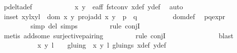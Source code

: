 \begin{isabellebody}
\ p{\isacharunderscore}delta{\isacharunderscore}def\ \isanewline
\ \ \ \ \ \ \ \ \isamarkupfalse%
\ {\isacartoucheopen}{\isasymtau}\ {\isacharparenleft}x{\isacharprime}{\isacharcomma}\ y{\isacharprime}{\isacharparenright}\ {\isasymin}\ e{\isacharunderscore}aff{\isacartoucheclose}\ fst{\isacharunderscore}conv\ x{\isacharprime}{\isacharprime}{\isacharunderscore}def\ y{\isacharprime}{\isacharprime}{\isacharunderscore}def\ \isamarkupfalse%
\ auto\isanewline
\ \ \ \ \ \ \isamarkupfalse%
\ in{\isacharunderscore}set{\isacharcolon}\ {\isachardoublequoteopen}{\isacharparenleft}{\isacharparenleft}{\isacharparenleft}x{\isacharcomma}y{\isacharparenright}{\isacharcomma}l{\isacharparenright}{\isacharcomma}{\isacharparenleft}{\isacharparenleft}x{\isacharprime}{\isacharprime}{\isacharcomma}y{\isacharprime}{\isacharprime}{\isacharparenright}{\isacharcomma}l{\isacharprime}{\isacharplus}{}{\isacharparenright}{\isacharparenright}\ {\isasymin}\ {\isacharparenleft}dom\ {\isacharparenleft}{\isasymlambda}{\isacharparenleft}x{\isacharcomma}\ y{\isacharparenright}{\isachardot}\ proj{\isacharunderscore}add\ x\ y{\isacharparenright}\ {\isasyminter}\ p\ {\isasymtimes}\ q{\isacharparenright}{\isachardoublequoteclose}\isanewline
\ \ \ \ \ \ \ \ \isamarkupfalse%
\ dom{\isacharunderscore}def\ \isamarkupfalse%
\ p{\isacharunderscore}q{\isacharunderscore}expr\ \isanewline
\ \ \ \ \ \ \ \ \isamarkupfalse%
{\isacharparenleft}simp\ del{\isacharcolon}\ {\isasymtau}{\isachardot}simps{\isacharparenright}\isanewline
\ \ \ \ \ \ \ \ \isamarkupfalse%
{\isacharparenleft}rule\ conjI{\isacharparenright}\isanewline
\ \ \ \ \ \ \ \ \isamarkupfalse%
\ {\isacharparenleft}metis\ add{\isacharunderscore}some\ surjective{\isacharunderscore}pairing{\isacharparenright}\isanewline
\ \ \ \ \ \ \ \ \isamarkupfalse%
{\isacharparenleft}rule\ conjI{\isacharparenright}\ \ \ \ \ \isanewline
\ \ \ \ \ \ \ \ \isamarkupfalse%
\ blast\isanewline
\ \ \ \ \ \ \ \ \isamarkupfalse%
\ {\isacartoucheopen}{\isacharparenleft}{\isasymtau}\ {\isacharparenleft}x{\isacharprime}{\isacharcomma}\ y{\isacharprime}{\isacharparenright}{\isacharcomma}\ l{\isacharprime}\ {\isacharplus}\ {}{\isacharparenright}\ {\isasymin}\ gluing\ {\isacharbackquote}{\isacharbackquote}\ {\isacharbraceleft}{\isacharparenleft}{\isacharparenleft}x{\isacharprime}{\isacharcomma}\ y{\isacharprime}{\isacharparenright}{\isacharcomma}\ l{\isacharprime}{\isacharparenright}{\isacharbraceright}{\isacartoucheclose}\ gluings{\isacharparenleft}{}{\isacharparenright}\ x{\isacharprime}{\isacharprime}{\isacharunderscore}def\ y{\isacharprime}{\isacharprime}{\isacharunderscore}def\ \isamarkupfalse%

\end{isabellebody}
